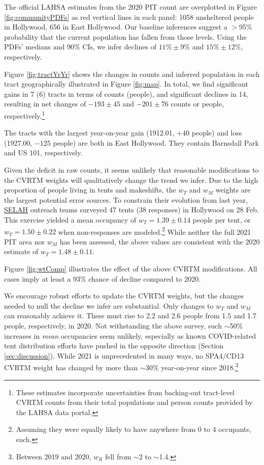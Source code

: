 \documentclass[11pt,twocolumn]{article}
\def\resp{respectively}
\begin{document}
The official LAHSA estimates from the 2020 PIT count are overplotted in Figure \ref{fig:communityPDFs} 
as red vertical lines in each panel: 1058 unsheltered people in Hollywood, 656 in East Hollywood.
Our baseline inferences suggest a $>$95\% probability that the current population has fallen from 
those levels. Using the PDFs' medians and 90\% CIs, we infer declines of $11\%\pm9\%$ and 
$15\%\pm12\%$, \resp. 

Figure \ref{fig:tractYrYr} shows the changes in counts and inferred population in each tract 
geographically illustrated in Figure \ref{fig:map}. In total, we find significant gains in 7 (6)
tracts in terms of counts (people), and significant declines in 14, resulting in net changes of $-193\pm45$
and $-201\pm76$ counts or people, \resp.\footnote{These estimates incorporate uncertainties 
from backing-out tract-level CVRTM counts from their total populations and person counts provided
by the LAHSA data portal.}

The tracts with the largest year-on-year gain (1912.01, $+40$ people) and loss (1927.00, $-125$ people)
are both in East Hollywood. They contain Barnsdall Park and US 101, \resp. 


Given the deficit in raw counts, it seems unlikely that reasonable modifications to the CVRTM weights 
will qualitatively change the trend we infer. Due to the high proportion of people living in tents and makeshifts,
the $w_{T}$ and $w_{M}$ weights are the largest potential error sources. To constrain their evolution
from last year, \href{https://selahnhc.org}{SELAH} outreach teams surveyed 47 tents (38 responses) 
in Hollywood on 28 Feb. This exercise yielded a mean occupancy of $w_{T}=1.39\pm0.14$ people per tent, 
or $w_{T}=1.50\pm0.22$ when non-responses are modeled.\footnote{Assuming they were equally likely to have 
anywhere from 0 to 4 occupants, each.} While neither the full 2021 PIT area nor $w_{M}$ has been assessed, the 
above values are consistent with the 2020 estimate of $w_{T}=1.48\pm0.11$. 

Figure \ref{fig:wtComp} illustrates the effect of the above CVRTM modifications. All cases imply at 
least a 93\% chance of decline compared to 2020.

We encourage robust efforts to update the CVRTM weights, but the changes needed to null the 
decline we infer are substantial. Only changes to $w_{T}$ and $w_{M}$ can reasonably 
achieve it. These must rise to 2.2 and 2.6 people from 1.5 and 1.7 people, \resp, in 2020. Not withstanding
the above survey, such $\sim$50\% increases in {\it mean} occupancies seem unlikely, especially as
known COVID-related tent distribution efforts have pushed in the opposite direction (Section 
\ref{sec:discussion}). While 2021 is unprecedented in many ways, no SPA4/CD13 CVRTM weight has 
changed by more than $\sim$30\% year-on-year since 2018.\footnote{Between 2019 and 2020, $w_{R}$ 
fell from $\sim$2 to $\sim$1.4.}
\end{document}
